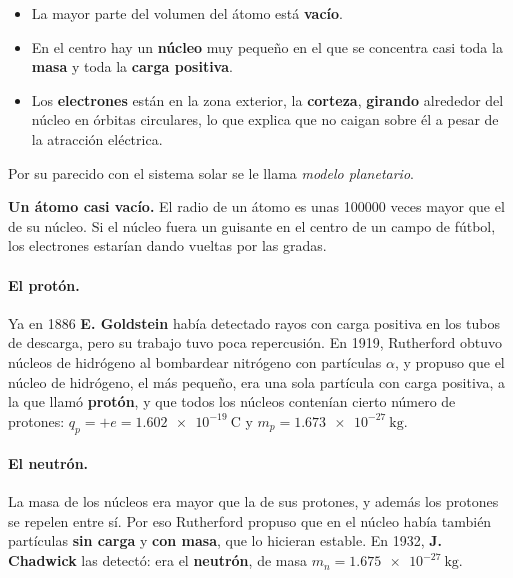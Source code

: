 \begin{definition}
    \leavevmode %
    \begin{itemize}
        \item La mayor parte del volumen del átomo está \textbf{vacío}.
        \item En el centro hay un \textbf{núcleo} muy pequeño en el que se concentra casi toda la \textbf{masa} y toda la
        \textbf{carga positiva}.
        \item Los \textbf{electrones} están en la zona exterior, la \textbf{corteza}, \textbf{girando} alrededor del núcleo en
        órbitas circulares, lo que explica que no caigan sobre él a pesar de la atracción eléctrica.
    \end{itemize}
    Por su parecido con el sistema solar se le llama \emph{modelo planetario}.
\end{definition}

\begin{remark}
    \textbf{Un átomo casi vacío.} El radio de un átomo es unas \num{100000} veces mayor que el de su núcleo. Si el núcleo fuera un
    guisante en el centro de un campo de fútbol, los electrones estarían dando vueltas por las gradas.
\end{remark}

\paragraph{El protón.} Ya en 1886 \textbf{E. Goldstein} había detectado rayos con carga positiva en los tubos de descarga, pero
su trabajo tuvo poca repercusión. En 1919, Rutherford obtuvo núcleos de hidrógeno al bombardear nitrógeno con partículas
\(\alpha\), y propuso que el núcleo de hidrógeno, el más pequeño, era una sola partícula con carga positiva, a la que llamó
\textbf{protón}, y que todos los núcleos contenían cierto número de protones:
\(q_p = +e = \qty{1.602e-19}{\coulomb}\) y \(m_p = \qty{1.673e-27}{\kilo\gram}\).

\paragraph{El neutrón.} La masa de los núcleos era mayor que la de sus protones, y además los protones se repelen entre sí. Por
eso Rutherford propuso que en el núcleo había también partículas \textbf{sin carga} y \textbf{con masa}, que lo hicieran estable.
En 1932, \textbf{J. Chadwick} las detectó: era el \textbf{neutrón}, de masa \(m_n = \qty{1.675e-27}{\kilo\gram}\).

